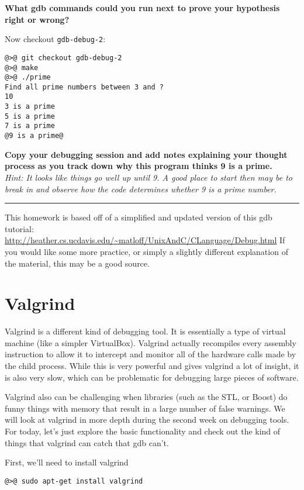 \documentclass{article}
\begin{document}
\textbf{What gdb commands could you run next to prove your hypothesis right or
  wrong?}
\vspace{3cm}


\newpage
Now checkout \texttt{gdb-debug-2}:
\begin{lstlisting}
@>@ git checkout gdb-debug-2
@>@ make
@>@ ./prime
Find all prime numbers between 3 and ?
10
3 is a prime
5 is a prime
7 is a prime
@9 is a prime@
\end{lstlisting}
\textbf{Copy your debugging session and add notes explaining your
  thought process as you track down why this program thinks 9 is a prime.}\\
\emph{\small Hint: It looks like things go well up until 9. A good place to
  start then may be to break in and observe how the code determines whether 9
  is a prime number.}

\vfill
\hrule
{\footnotesize
This homework is based off of a simplified and updated version of this gdb
tutorial:
\url{http://heather.cs.ucdavis.edu/~matloff/UnixAndC/CLanguage/Debug.html}
If you would like some more practice, or simply a slightly different
explanation of the material, this may be a good source.
}


\newpage
\section{Valgrind}

Valgrind is a different kind of debugging tool. It is essentially a type of
virtual machine (like a simpler VirtualBox). Valgrind actually recompiles
every assembly instruction to allow it to intercept and monitor all of the
hardware calls made by the child process. While this is very powerful and
gives valgrind a lot of insight, it is also very slow, which can be
problematic for debugging large pieces of software.

Valgrind also can be challenging when libraries (such as the STL, or Boost) do
funny things with memory that result in a large number of false warnings. We
will look at valgrind in more depth during the second week on debugging
tools. For today, let's just explore the basic functionality and check out the
kind of things that valgrind can catch that gdb can't.

First, we'll need to install valgrind
\begin{lstlisting}
@>@ sudo apt-get install valgrind
\end{lstlisting}
\end{document}
